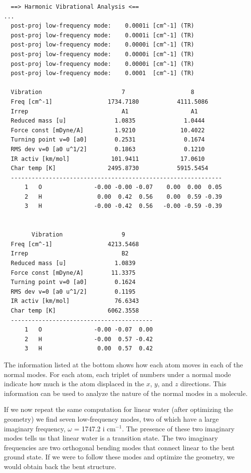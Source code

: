\documentclass[../Main/chem371-notes.tex]{subfiles}
\begin{document}
\begin{small}
\begin{verbatim}
  ==> Harmonic Vibrational Analysis <==
...
  post-proj low-frequency mode:    0.0001i [cm^-1] (TR)
  post-proj low-frequency mode:    0.0001i [cm^-1] (TR)
  post-proj low-frequency mode:    0.0000i [cm^-1] (TR)
  post-proj low-frequency mode:    0.0000i [cm^-1] (TR)
  post-proj low-frequency mode:    0.0000i [cm^-1] (TR)
  post-proj low-frequency mode:    0.0001  [cm^-1] (TR)

  Vibration                       7                   8
  Freq [cm^-1]                1734.7180           4111.5086
  Irrep                           A1                  A1
  Reduced mass [u]              1.0835              1.0444
  Force const [mDyne/A]         1.9210             10.4022
  Turning point v=0 [a0]        0.2531              0.1674
  RMS dev v=0 [a0 u^1/2]        0.1863              0.1210
  IR activ [km/mol]            101.9411            17.0610
  Char temp [K]               2495.8730           5915.5454
  -------------------------------------------------------------
      1   O               -0.00 -0.00 -0.07    0.00  0.00  0.05
      2   H                0.00  0.42  0.56    0.00  0.59 -0.39
      3   H               -0.00 -0.42  0.56   -0.00 -0.59 -0.39
      
      
        Vibration                 9           
  Freq [cm^-1]                4213.5468       
  Irrep                           B2          
  Reduced mass [u]              1.0839        
  Force const [mDyne/A]        11.3375        
  Turning point v=0 [a0]        0.1624        
  RMS dev v=0 [a0 u^1/2]        0.1195        
  IR activ [km/mol]             76.6343        
  Char temp [K]               6062.3558       
  -----------------------------------------
      1   O               -0.00 -0.07  0.00   
      2   H               -0.00  0.57 -0.42   
      3   H                0.00  0.57  0.42   
\end{verbatim}
\end{small}

The information listed at the bottom shows how each atom moves in each of the normal modes.
For each atom, each triplet of numbers under a normal mode indicate how much is the atom displaced in the $x$, $y$, and $z$ directions.
This information can be used to analyze the nature of the normal modes in a molecule.

If we now repeat the same computation for linear water (after optimizing the geometry) we find seven low-frequency modes, two of which have a large imaginary frequency, $\omega$ = 1747.2 i cm$^{-1}$.
The presence of these two imaginary modes tells us that linear water is a transition state.
The two imaginary frequencies are two orthogonal bending modes that connect linear  to the bent ground state.
If we were to follow these modes and optimize the geometry, we would obtain back the bent structure.
\end{document}
